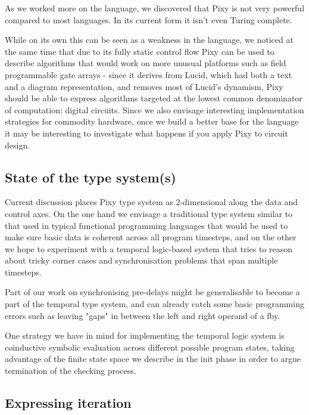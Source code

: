 \documentclass{scrartcl}
\begin{document}
    As we worked more on the language, we discovered that Pixy is not very powerful compared to most languages. In its current form it isn't even Turing complete.
    
    While on its own this can be seen as a weakness in the language, we noticed at the same time that due to its fully static control flow Pixy can be used to describe algorithms that would work on more unusual platforms such as field programmable gate arrays - since it derives from Lucid, which had both a text and a diagram representation, and removes most of Lucid's dynamism, Pixy should be able to express algorithms targeted at the lowest common denominator of computation: digital circuits. Since we also envisage interesting implementation strategies for commodity hardware, once we build a better base for the language it may be interesting to investigate what happens if you apply Pixy to circuit design.
    
    \subsection{State of the type system(s)}
    
    Current discussion places Pixy type system as 2-dimensional along the data and control axes. On the one hand we envisage a traditional type system similar to that used in typical functional programming languages that would be used to make sure basic data is coherent across all program timesteps, and on the other we hope to experiment with a temporal logic-based system that tries to reason about tricky corner cases and synchronisation problems that span multiple timesteps.
    
    Part of our work on synchronising pre-delays might be generalisable to become a part of the temporal type system, and can already catch some basic programming errors such as leaving "gaps" in between the left and right operand of a fby.
    
    One strategy we have in mind for implementing the temporal logic system is coinductive symbolic evaluation across different possible program states, taking advantage of the finite state space we describe in the init phase in order to argue termination of the checking process.
    
    \subsection{Expressing iteration}
    
\end{document}
